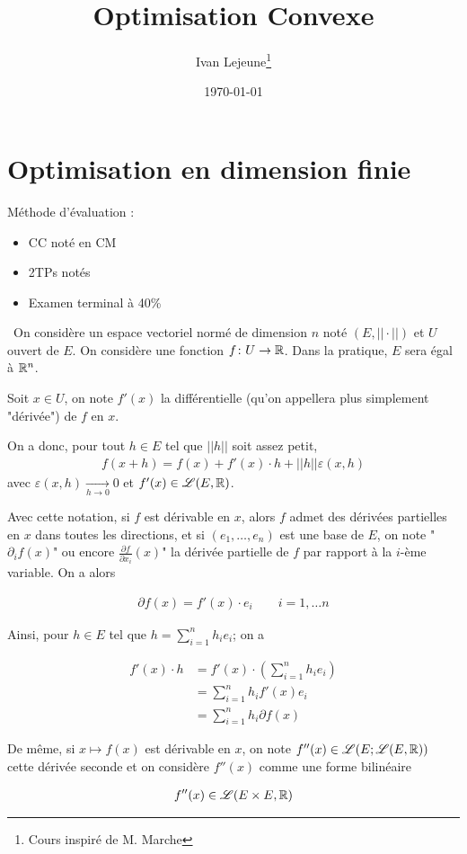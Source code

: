 \documentclass[french,a4paper,10pt]{article}
\title{\color{astral} \sffamily \bfseries Optimisation Convexe}
\author{Ivan Lejeune\thanks{Cours inspiré de M. Marche}}
\date{\today}
\begin{document}
	
	\maketitle
	\section{Optimisation en dimension finie}
	\begin{oc-intro}
		Méthode d'évaluation :
		\begin{itemize}
			\item CC noté en CM
			\item 2TPs notés
			\item Examen terminal à 40\%
		\end{itemize}
	\end{oc-intro}
	
	\begin{oc-notation}\,
		On considère un espace vectoriel normé de dimension $n$ noté $(E, ||\cdot||)$ et $U$ ouvert de $E$. On considère une fonction $f\colon U\to \mathbb{R}$. Dans la pratique, $E$ sera égal à $\mathbb{R}^n$. 
		
		Soit $x\in U$, on note $f'(x)$ la différentielle (qu'on appellera plus simplement "dérivée") de $f$ en $x$. 
		
		On a donc, pour tout $h\in E$ tel que $||h||$ soit assez petit, 
		\[\begin{aligned}
			f(x+h)=f(x)+f'(x)\cdot h+||h||\varepsilon(x, h)
		\end{aligned}\]
		avec $\varepsilon(x, h)\underset{h\to 0}\to 0$
		et $f'(x)\in\mathscr{L}(E, \mathbb{R})$.
		
		Avec cette notation, si $f$ est dérivable en $x$, alors $f$ admet des dérivées partielles en $x$ dans toutes les directions, et si $(e_1,\dots,e_n)$ est une base de $E$, on note "$\partial_i f(x)$" ou encore $\frac{\partial f}{\partial x_i}(x)$" la dérivée partielle de $f$ par rapport à la $i$-ème variable. On a alors
		
		\[\begin{aligned}
			\partial f(x)=f'(x)\cdot e_i\qquad i=1,\dots n
		\end{aligned}\]
		
		Ainsi, pour $h\in E$ tel que $h=\sum_{i=1}^nh_ie_i$; on a
		
		\[\begin{aligned}
			f'(x)\cdot h &= f'(x)\cdot\left(\sum_{i=1}^nh_ie_i\right)\\
			&=\sum_{i=1}^n h_i f'(x) e_i\\
			&=\sum_{i=1}^{n} h_i\partial f(x)
		\end{aligned}\]
		
		De même, si $x\mapsto f(x)$ est dérivable en $x$, on note $f''(x)\in\mathscr{L}(E;\mathscr{L}(E, \mathbb{R}))$ cette dérivée seconde et on considère $f''(x)$ comme une forme bilinéaire 
		
		\[\begin{aligned}
			f''(x)\in\mathscr{L}(E\times E,\mathbb{R})
		\end{aligned}\]
	\end{oc-notation}
	
\end{document}
